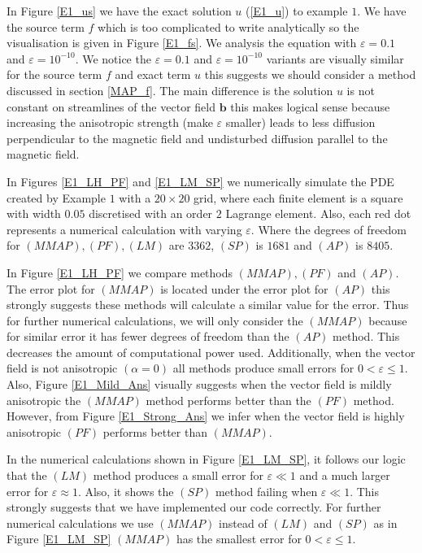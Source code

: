 \documentclass[12pt]{ociamthesis}
\begin{document}
In Figure \ref{E1_us} we have the exact solution $u$ (\ref{E1_u}) to example $1$. We have the source term $f$ which is too complicated to write analytically so the visualisation is given in Figure \ref{E1_fs}. We analysis the equation with $\varepsilon = 0.1$ and $\varepsilon = 10^{-10}$. We notice the $\varepsilon = 0.1$ and $\varepsilon = 10^{-10}$ variants are visually similar for the source term $f$ and exact term $u$ this suggests we should consider a method discussed in section \ref{MAP_f}. The main difference is the solution $u$ is not constant on streamlines of the vector field $\mathbf{b}$ this makes logical sense because increasing the anisotropic strength (make $\varepsilon$ smaller) leads to less diffusion perpendicular to the magnetic field and undisturbed diffusion parallel to the magnetic field.

In Figures \ref{E1_LH_PF} and \ref{E1_LM_SP} we numerically simulate the PDE created by Example $1$ with a $20 \times 20$ grid, where each finite element is a square with width $0.05$ discretised with an order $2$ Lagrange element. Also, each red dot represents a numerical calculation with varying $\varepsilon$. Where the degrees of freedom for $(MMAP), (PF), (LM)$ are $3362$, $(SP)$ is $1681$ and $(AP)$ is $8405$.

In Figure \ref{E1_LH_PF} we compare methods $(MMAP), (PF)$ and $(AP)$. The error plot for $(MMAP)$ is located under the error plot for $(AP)$ this strongly suggests these methods will calculate a similar value for the error. Thus for further numerical calculations, we will only consider the $(MMAP)$ because for similar error it has fewer degrees of freedom than the $(AP)$ method. This decreases the amount of computational power used. Additionally, when the vector field is not anisotropic $(\alpha = 0)$ all methods produce small errors for $0 <\varepsilon \leq 1$. Also, Figure \ref{E1_Mild_Ans} visually suggests when the vector field is mildly anisotropic the $(MMAP)$ method performs better than the $(PF)$ method. However, from Figure \ref{E1_Strong_Ans} we infer when the vector field is highly anisotropic $(PF)$ performs better than $(MMAP)$. 

In the numerical calculations shown in Figure \ref{E1_LM_SP}, it follows our logic that the $(LM)$ method produces a small error for $\varepsilon \ll 1$ and a much larger error for $\varepsilon \approx 1$. Also, it shows the $(SP)$ method failing when $\varepsilon \ll 1$. This strongly suggests that we have implemented our code correctly. For further numerical calculations we use $(MMAP)$ instead of $(LM)$ and $(SP)$ as in Figure \ref{E1_LM_SP} $(MMAP)$ has the smallest error for  $0 < \varepsilon \leq 1$.
\end{document}

